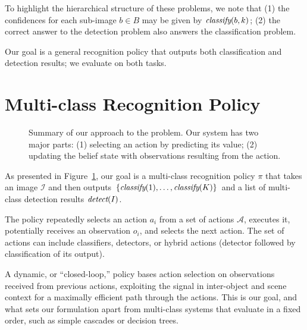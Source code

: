 To highlight the hierarchical structure of these problems, we note that (1) the confidences for each sub-image $b \in B$ may be given by $\emph{classify}(b,k)$; (2) the correct answer to the detection problem also answers the classification problem. 

Our goal is a general recognition policy that outputs both classification and detection results; we evaluate on both tasks.

\section{Multi-class Recognition Policy} \label{sec:tech}
\begin{figure}[h!]
  \caption{Summary of our approach to the problem. Our system has two major parts: (1) selecting an action by predicting its value; (2) updating the belief state with observations resulting from the action.}
  \label{fig:pomdp}
\end{figure}

As presented in Figure~\ref{fig:pomdp}, our goal is a multi-class recognition policy $\pi$ that takes an image $\mathcal{I}$ and then outputs $\{\emph{classify}(1), \dots, \emph{classify}(K)\}$ and a list of multi-class detection results $\emph{detect}(I)$.

The policy repeatedly selects an action $a_i$ from a set of actions $\mathcal{A}$, executes it, potentially receives an observation $o_i$, and selects the next action.
The set of actions can include classifiers, detectors, or hybrid actions (detector followed by classification of its output).

A dynamic, or ``closed-loop,'' policy bases action selection on observations received from previous actions, exploiting the signal in inter-object and scene context for a maximally efficient path through the actions.
This is our goal, and what sets our formulation apart from multi-class systems that evaluate in a fixed order, such as simple cascades \cite{Viola2001} or decision trees.

